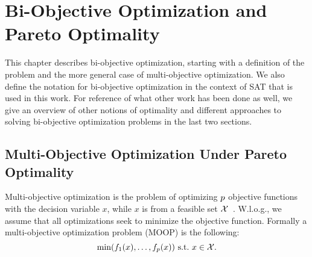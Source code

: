 \chapter{Bi-Objective Optimization and Pareto Optimality\label{chap:biobjective-optimization}}

This chapter describes bi-objective optimization, starting with a definition of the problem and the more general case of multi-objective optimization.
We also define the notation for bi-objective optimization in the context of SAT that is used in this work.
For reference of what other work has been done as well, we give an overview of other notions of optimality and different approaches to solving bi-objective optimization problems in the last two sections.

\section{Multi-Objective Optimization Under Pareto Optimality\label{sec:multiopt}}

Multi-objective optimization is the problem of optimizing $p$ objective functions with the decision variable $x$, while $x$ is from a feasible set $\mathcal{X}$~\autocite{Ehrgott2005-1}.
W.l.o.g., we assume that all optimizations seek to minimize the objective function.
Formally a multi-objective optimization problem (MOOP) is the following:
\begin{equation}\label{eq:moop}
  \min (f_1(x),\dots,f_p(x))\ \text{s.t.}\ x\in \mathcal{X}.
\end{equation}


